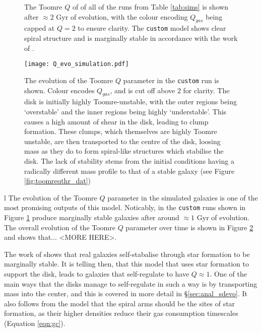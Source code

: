 \begin{figure}[!ht]
    \leavevmode\rlap{\usebox{\graphicsbox}}%
    \begin{minipage}[b]{0.63\wd\graphicsbox}%
        \caption{The Toomre $Q$ of of all of the runs from Table \ref{tab:sims} is shown after $\approx 2$ Gyr of evolution, with the colour encoding $Q_{gas}$ being capped at $Q=2$ to ensure clarity. The {\tt custom} model shows clear spiral structure and is marginally stable in accordance with the work of \citet{hopkins_stellar_2012}.}
        \label{fig:toomqsimbigfig}
    \end{minipage}\hspace*{0.33\wd\graphicsbox}%
\end{figure}

\begin{figure}[!ht]
    \texttt{[image: Q\_evo\_simulation.pdf]}
    \caption{The evolution of the Toomre $Q$ parameter in the {\tt custom} run is shown. Colour encodes $Q_{gas}$, and is cut off above $2$ for clarity. The disk is initially highly Toomre-unstable, with the outer regions being `overstable' and the inner regions being highly `understable'. This causes a high amount of shear in the disk, leading to clump formation. These clumps, which themselves are highly Toomre unstable, are then transported to the centre of the disk, loosing mass as they do to form spiral-like structures which stabilise the disk. The lack of stability stems from the initial conditions having a radically different mass profile to that of a stable galaxy (see Figure \ref{fig:toomreqthr_dat})}
    \label{fig:toomqsimsmallfig}
\end{figure}
l
The evolution of the Toomre $Q$ parameter in the simulated galaxies is one of the most promising outputs of this model.
Noticably, in the {\tt custom} runs shown in Figure \ref{fig:toomqsimbigfig} produce marginally stable galaxies after around $\approx 1$ Gyr of evolution.
The overall evolution of the Toomre $Q$ parameter over time is shown in Figure \ref{fig:toomqsimsmallfig} and shows that... <MORE HERE>.

The work of \citet{hopkins_stellar_2012} shows that real galaxies self-stabalise through star formation to be marginally stable.
It is telling then, that this model that uses star formation to support the disk, leads to galaxies that self-regulate to have $Q\approx1$.
One of the main ways that the disks manage to self-regulate in such a way is by transporting mass into the center, and this is covered in more detail in \S \ref{sec:anal_sdevo}.
It also follows from the model that the spiral arms should be the sites of star formation, as their higher densities reduce their gas consumption timescales (Equation \ref{eqn:gc}).

